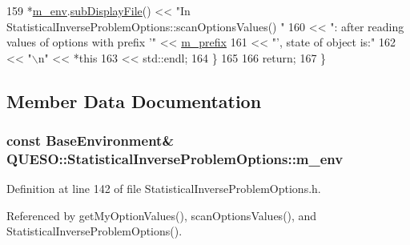 \begin{DoxyCode}
159     *\hyperlink{class_q_u_e_s_o_1_1_statistical_inverse_problem_options_afce40a7fed3b00fc8cabad7ff81ef35f}{m\_env}.\hyperlink{class_q_u_e_s_o_1_1_base_environment_a8a0064746ae8dddfece4229b9ad374d6}{subDisplayFile}() << \textcolor{stringliteral}{"In StatisticalInverseProblemOptions::scanOptionsValues()
      "}
160                             << \textcolor{stringliteral}{": after reading values of options with prefix '"} << 
      \hyperlink{class_q_u_e_s_o_1_1_statistical_inverse_problem_options_ad58cf6e7350173ebea80576184a97e2b}{m\_prefix}
161                             << \textcolor{stringliteral}{"', state of  object is:"}
162                             << \textcolor{stringliteral}{"\(\backslash\)n"} << *\textcolor{keyword}{this}
163                             << std::endl;
164   \}
165 
166   \textcolor{keywordflow}{return};
167 \}
\end{DoxyCode}


\subsection{Member Data Documentation}
\hypertarget{class_q_u_e_s_o_1_1_statistical_inverse_problem_options_afce40a7fed3b00fc8cabad7ff81ef35f}{
\subsubsection[{m\-\_\-env}]{\setlength{\rightskip}{0pt plus 5cm}const {\bf Base\-Environment}\& Q\-U\-E\-S\-O\-::\-Statistical\-Inverse\-Problem\-Options\-::m\-\_\-env\hspace{0.3cm}{\ttfamily [private]}}}\label{class_q_u_e_s_o_1_1_statistical_inverse_problem_options_afce40a7fed3b00fc8cabad7ff81ef35f}


Definition at line 142 of file Statistical\-Inverse\-Problem\-Options.\-h.



Referenced by get\-My\-Option\-Values(), scan\-Options\-Values(), and Statistical\-Inverse\-Problem\-Options().

